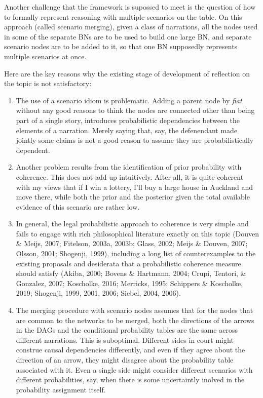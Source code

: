 \documentclass[11pt,dvipsnames,enabledeprecatedfontcommands]{scrartcl}
\begin{document}
Another challenge that the framework is supossed to meet is the question
of how to formally represent reasoning with multiple scenarios on the
table. On this approach (called scenario merging), given a class of
narrations, all the nodes used in some of the separate BNs are to be
used to build one large BN, and separate scenario nodes are to be added
to it, so that one BN supposedly represents multiple scenarios at once.

Here are the key reasons why the existing stage of development of
reflection on the topic is not satisfactory:

\begin{enumerate}
\def\labelenumi{\Alph{enumi}.}
\item
  The use of a scenario idiom is problematic. Adding a parent node by
  \emph{fiat} without any good reasons to think the nodes are connected
  other than being part of a single story, introduces probabilistic
  dependencies between the elements of a narration. Merely saying that,
  say, the defenendant made jointly some claims is not a good reason to
  assume they are probabilistically dependent.
\item
  Another problem results from the identification of prior probability
  with coherence. This does not add up intuitively. After all, it is
  quite coherent with my views that if I win a lottery, I'll buy a large
  house in Auckland and move there, while both the prior and the
  posterior given the total available evidence of this scenario are
  rather low.
\item
  In general, the legal probabilistic approach to coherence is very
  simple and fails to engage with rich philosophical literature exactly
  on this topic (Douven \& Meijs, 2007; Fitelson, 2003a, 2003b; Glass,
  2002; Meijs \& Douven, 2007; Olsson, 2001; Shogenji, 1999), including
  a long list of counterexamples to the existing proposals and
  desiderata that a probabilistic coherence measure should satisfy
  (Akiba, 2000; Bovens \& Hartmann, 2004; Crupi, Tentori, \& Gonzalez,
  2007; Koscholke, 2016; Merricks, 1995; Schippers \& Koscholke, 2019;
  Shogenji, 1999, 2001, 2006; Siebel, 2004, 2006).
\item
  The merging procedure with scenario nodes assumes that for the nodes
  that are common to the networks to be merged, both the directions of
  the arrows in the DAGs and the conditional probability tables are the
  same across different narrations. This is suboptimal. Different sides
  in court might construe causal dependencies differently, and even if
  they agree about the direction of an arrow, they might disagree about
  the probability table associated with it. Even a single side might
  consider different scenarios with different probabilities, say, when
  there is some uncertaintly inolved in the probability assignment
  itself.
\end{enumerate}
\end{document}
